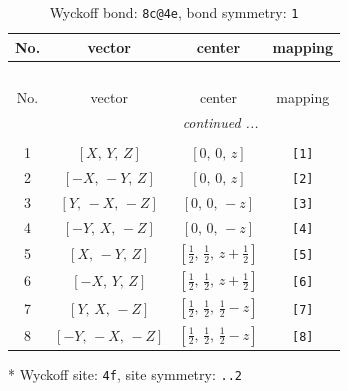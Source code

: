 \documentclass[fleqn,8pt]{jsarticle}
\begin{document}
\renewcommand{\arraystretch}{1.2}
\begin{longtable}{cccc}
\caption{Wyckoff bond: {\tt 8c@4e}, bond symmetry: {\tt 1}}
 \\
 \hline \hline
No. & vector & center & mapping \\ \hline \endfirsthead

\multicolumn{3}{l}{\tablename\ \thetable{}} \\
 \hline \hline
No. & vector & center & mapping \\ \hline \endhead

 \hline \hline
\multicolumn{3}{r}{\footnotesize\it continued ...} \\ \endfoot

 \hline \hline
\multicolumn{3}{r}{} \\ \endlastfoot

1 & $\left[ X,\, Y,\, Z \right]$ & $\left[ 0,\, 0,\, z \right]$ & {\tt [1]} \\ \hline
2 & $\left[ - X,\, - Y,\, Z \right]$ & $\left[ 0,\, 0,\, z \right]$ & {\tt [2]} \\ \hline
3 & $\left[ Y,\, - X,\, - Z \right]$ & $\left[ 0,\, 0,\, - z \right]$ & {\tt [3]} \\ \hline
4 & $\left[ - Y,\, X,\, - Z \right]$ & $\left[ 0,\, 0,\, - z \right]$ & {\tt [4]} \\ \hline
5 & $\left[ X,\, - Y,\, Z \right]$ & $\left[ \frac{1}{2},\, \frac{1}{2},\, z + \frac{1}{2} \right]$ & {\tt [5]} \\ \hline
6 & $\left[ - X,\, Y,\, Z \right]$ & $\left[ \frac{1}{2},\, \frac{1}{2},\, z + \frac{1}{2} \right]$ & {\tt [6]} \\ \hline
7 & $\left[ Y,\, X,\, - Z \right]$ & $\left[ \frac{1}{2},\, \frac{1}{2},\, \frac{1}{2} - z \right]$ & {\tt [7]} \\ \hline
8 & $\left[ - Y,\, - X,\, - Z \right]$ & $\left[ \frac{1}{2},\, \frac{1}{2},\, \frac{1}{2} - z \right]$ & {\tt [8]} \\
\end{longtable}
* Wyckoff site: {\tt 4f}, site symmetry: {\tt ..2}
\renewcommand{\arraystretch}{1.2}
\end{document}
